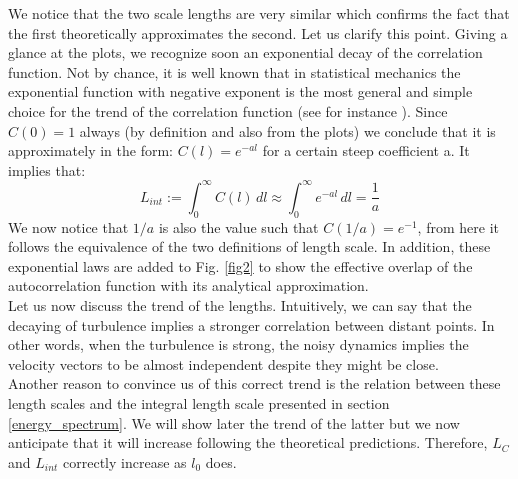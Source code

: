 \documentclass[11pt,titlepage]{article}
\begin{document}
We notice that the two scale lengths are very similar which confirms the fact that the first theoretically approximates the second. Let us clarify this point. Giving a glance at the plots, we recognize soon an exponential decay of the correlation function. Not by chance, it is well known that in statistical mechanics the exponential function with negative exponent is the most general and simple choice for the trend of the correlation function (see for instance \cite{penrose_1974}). Since $C(0)=1$ always (by definition and also from the plots) we conclude that it is approximately in the form: $C(l) = e^{-al}$ for a certain steep coefficient a. It implies that:
\begin{equation*}
	L_{int} := \int_0^{\infty} C(l)\, dl \approx  \int_0^{\infty} e^{-al}\, dl = \frac{1}{a}
\end{equation*}
We now notice that $1/a$ is also the value such that $C(1/a) = e^{-1}$, from here it follows the equivalence of the two definitions of length scale. In addition, these exponential laws are added to Fig. \ref{fig2} to show the effective overlap of the autocorrelation function with its analytical approximation.\\
Let us now discuss the trend of the lengths. Intuitively, we can say that the decaying of turbulence implies a stronger correlation between distant points. In other words, when the turbulence is strong, the noisy dynamics implies the velocity vectors to be almost independent despite they might be close. \\ 
Another reason to convince us of this correct trend is the relation between these length scales and the integral length scale presented in section \ref{energy_spectrum}. We will show later the trend of the latter but we now anticipate that it will increase following the theoretical predictions. Therefore, $L_C$ and $L_{int}$ correctly increase as $l_0$ does.
\end{document}
